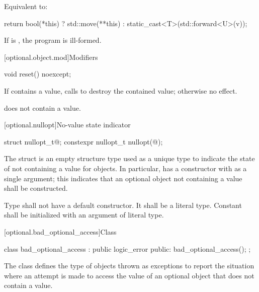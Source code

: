 \begin{itemdescr}
\pnum
\effects
Equivalent to:
\begin{codeblock}
return bool(*this) ? std::move(**this) : static_cast<T>(std::forward<U>(v));
\end{codeblock}

\pnum
\remarks
If  is ,
the program is ill-formed.
\end{itemdescr}

[optional.object.mod]{Modifiers}

%
\begin{itemdecl}
void reset() noexcept;
\end{itemdecl}

\begin{itemdescr}
\pnum
\effects
If  contains a value, calls  to destroy the contained value;
otherwise no effect.

\pnum
\postconditions
{} does not contain a value.
\end{itemdescr}

[optional.nullopt]{No-value state indicator}

%
%
\begin{itemdecl}
struct nullopt_t{@\seebelow@};
constexpr nullopt_t nullopt(@\unspec@);
\end{itemdecl}

\pnum
The struct  is an empty structure type used as a unique type to indicate the state of not containing a value for  objects.
In particular,  has a constructor with  as a single argument;
this indicates that an optional object not containing a value shall be constructed.

\pnum
Type  shall not have a default constructor. It shall be a literal type. Constant  shall be initialized with an argument of literal type.

[optional.bad_optional_access]{Class }

\begin{codeblock}
class bad_optional_access : public logic_error {
public:
  bad_optional_access();
};
\end{codeblock}

\pnum
The class  defines the type of objects thrown as exceptions to report the situation where an attempt is made to access the value of an optional object that does not contain a value.

